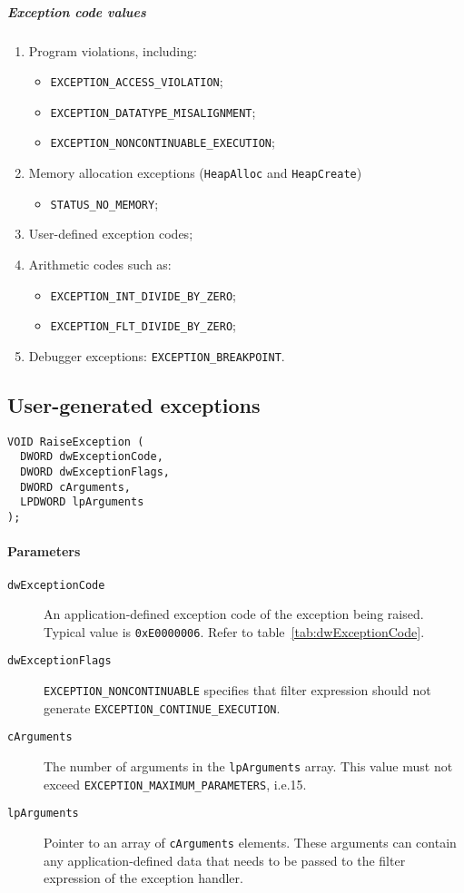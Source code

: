 \subparagraph{Exception code values}
\begin{enumerate}
\item Program violations, including:
\begin{itemize}
\item \texttt{EXCEPTION\_ACCESS\_VIOLATION};
\item \texttt{EXCEPTION\_DATATYPE\_MISALIGNMENT};
\item \texttt{EXCEPTION\_NONCONTINUABLE\_EXECUTION};
\end{itemize}
\item Memory allocation exceptions (\texttt{HeapAlloc} and \texttt{HeapCreate})
\begin{itemize}
\item \texttt{STATUS\_NO\_MEMORY};
\end{itemize}
\item User-defined exception codes;
\item Arithmetic codes such as:
\begin{itemize}
\item \texttt{EXCEPTION\_INT\_DIVIDE\_BY\_ZERO};
\item \texttt{EXCEPTION\_FLT\_DIVIDE\_BY\_ZERO};
\end{itemize}
\item Debugger exceptions: \texttt{EXCEPTION\_BREAKPOINT}.
\end{enumerate}

\subsection{User-generated exceptions}
\begin{verbatim}
VOID RaiseException (
  DWORD dwExceptionCode,
  DWORD dwExceptionFlags,
  DWORD cArguments,
  LPDWORD lpArguments
);
\end{verbatim}

\paragraph{Parameters}
\begin{description}
\item [\texttt{dwExceptionCode}] An application-defined exception code of the exception being raised. Typical value is \texttt{0xE0000006}. Refer to table~\ref{tab:dwExceptionCode}.
\item [\texttt{dwExceptionFlags}] \texttt{EXCEPTION\_NONCONTINUABLE} specifies that filter expression should not generate \texttt{EXCEPTION\_CONTINUE\_EXECUTION}.
\item [\texttt{cArguments}] The number of arguments in the \texttt{lpArguments} array. This value must not exceed \texttt{EXCEPTION\_MAXIMUM\_PARAMETERS}, i.e.\@ 15.
\item [\texttt{lpArguments}] Pointer to an array of \texttt{cArguments} elements. These arguments can contain any application-defined data that needs to be passed to the filter expression of the exception handler.
\end{description}


